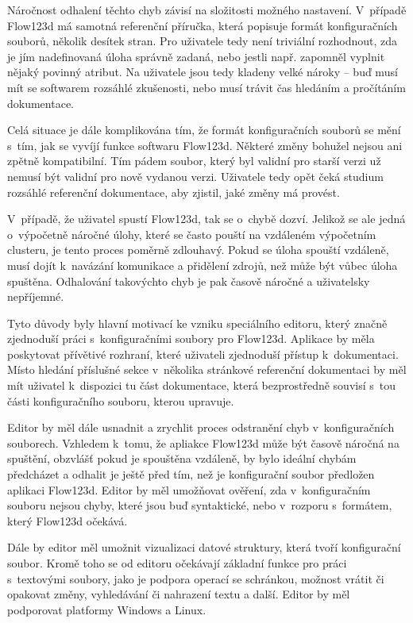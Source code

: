 \documentclass[FM,DP]{tulthesis}
\begin{document}

Náročnost odhalení těchto chyb závisí na složitosti možného nastavení. V~případě Flow123d má samotná referenční příručka, která popisuje formát konfiguračních souborů, několik desítek stran. Pro uživatele tedy není triviální rozhodnout, zda je jím nadefinovaná úloha správně zadaná, nebo jestli např. zapomněl vyplnit nějaký povinný atribut. Na uživatele jsou tedy kladeny velké nároky -- buď musí mít se softwarem rozsáhlé zkušenosti, nebo musí trávit čas hledáním a pročítáním dokumentace.

Celá situace je dále komplikována tím, že formát konfiguračních souborů se mění s~tím, jak se vyvíjí funkce softwaru Flow123d. Některé změny bohužel nejsou ani zpětně kompatibilní. Tím pádem soubor, který byl validní pro starší verzi už nemusí být validní pro nově vydanou verzi. Uživatele tedy opět čeká studium rozsáhlé referenční dokumentace, aby zjistil, jaké změny má provést.

V~případě, že uživatel spustí Flow123d, tak se o~chybě dozví. Jelikož se ale jedná o~výpočetně náročné úlohy, které se často pouští na vzdáleném výpočetním clusteru, je tento proces poměrně zdlouhavý. Pokud se úloha spouští vzdáleně, musí dojít k~navázání komunikace a přidělení zdrojů, než může být vůbec úloha spuštěna. Odhalování takovýchto chyb je pak časově náročné a uživatelsky nepříjemné.

Tyto důvody byly hlavní motivací ke vzniku speciálního editoru, který značně zjednoduší práci s~konfiguračními soubory pro Flow123d. Aplikace by měla poskytovat přívětivé rozhraní, které uživateli zjednoduší přístup k~dokumentaci. Místo hledání příslušné sekce v~několika stránkové referenční dokumentaci by měl mít uživatel k~dispozici tu část dokumentace, která bezprostředně souvisí s~tou části konfiguračního souboru, kterou upravuje.

Editor by měl dále usnadnit a zrychlit proces odstranění chyb v~konfiguračních souborech. Vzhledem k~tomu, že apliakce Flow123d může být časově náročná na spuštění, obzvlášť pokud je spouštěna vzdáleně, by bylo ideální chybám předcházet a odhalit je ještě před tím, než je konfigurační soubor předložen aplikaci Flow123d. Editor by měl umožňovat ověření, zda v~konfiguračním souboru nejsou chyby, které jsou buď syntaktické, nebo v~rozporu s~formátem, který Flow123d očekává.

Dále by editor měl umožnit vizualizaci datové struktury, která tvoří konfigurační soubor. Kromě toho se od editoru očekávají základní funkce pro práci s~textovými soubory, jako je podpora operací se schránkou, možnost vrátit či opakovat změny, vyhledávání či nahrazení textu a další. Editor by měl podporovat platformy Windows a Linux. %
\end{document}

